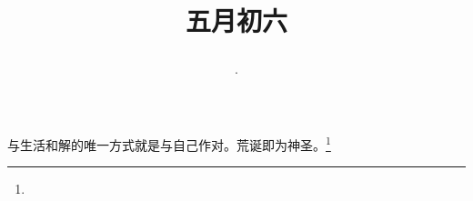 \title{\date[d=11,m=6,y=2024][year:cn-y,年,month:cn,day:cn,日,·,weekday]·五月初六 }
与生活和解的唯一方式就是与自己作对。荒诞即为神圣。\footnote{ }

